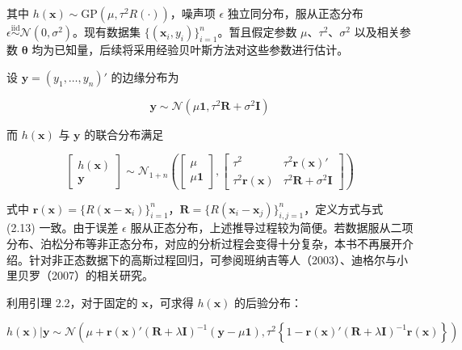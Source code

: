 \documentclass{ctexart}
\begin{document}
其中 $h(\boldsymbol{x})\sim\mathrm{GP}(\mu,\tau^2R(\cdot))$，噪声项 $\epsilon$ 独立同分布，服从正态分布 $\epsilon\stackrel{\text{iid}}{\sim}\mathcal{N}(0,\sigma^2)$。现有数据集 $\{(\boldsymbol{x}_i,y_i)\}_{i=1}^n$。暂且假定参数 $\mu$、$\tau^2$、$\sigma^2$ 以及相关参数 $\boldsymbol{\theta}$ 均为已知量，后续将采用经验贝叶斯方法对这些参数进行估计。

设 $\boldsymbol{y}=(y_1,\dots,y_n)'$ 的边缘分布为

\begin{equation*}
\boldsymbol{y}\sim\mathcal{N}(\mu\boldsymbol{1},\tau^2\boldsymbol{R}+\sigma^2\boldsymbol{I})
\end{equation*}

而 $h(\boldsymbol{x})$ 与 $\boldsymbol{y}$ 的联合分布满足

\begin{equation*}
\begin{bmatrix}
h(\boldsymbol{x})\\\boldsymbol{y}
\end{bmatrix}
\sim\mathcal{N}_{1+n}
\left(\begin{bmatrix}
\mu\\\mu\boldsymbol{1}
\end{bmatrix},\begin{bmatrix}
\tau^2&\tau^2\boldsymbol{r}(\boldsymbol{x})'\\
\tau^2\boldsymbol{r}(\boldsymbol{x})&\tau^2\boldsymbol{R}+\sigma^2\boldsymbol{I}
\end{bmatrix}\right)
\end{equation*}

式中 $\boldsymbol{r}(\boldsymbol{x})=\{R(\boldsymbol{x}-\boldsymbol{x}_i)\}_{i=1}^n$，$\boldsymbol{R}=\{R(\boldsymbol{x}_i-\boldsymbol{x}_j)\}_{i,j=1}^n$，定义方式与式 (2.13) 一致。由于误差 $\epsilon$ 服从正态分布，上述推导过程较为简便。若数据服从二项分布、泊松分布等非正态分布，对应的分析过程会变得十分复杂，本书不再展开介绍。针对非正态数据下的高斯过程回归，可参阅班纳吉等人（2003）、迪格尔与小里贝罗（2007）的相关研究。

利用引理 2.2，对于固定的 $\boldsymbol{x}$，可求得 $h(\boldsymbol{x})$ 的后验分布：

\begin{equation*}
h(\boldsymbol{x})|\boldsymbol{y}\sim\mathcal{N}\left(\mu+\boldsymbol{r}(\boldsymbol{x})'(\boldsymbol{R}+\lambda\boldsymbol{I})^{-1}(\boldsymbol{y}-\mu\boldsymbol{1}),\tau^2\left\{1-\boldsymbol{r}(\boldsymbol{x})'(\boldsymbol{R}+\lambda\boldsymbol{I})^{-1}\boldsymbol{r}(\boldsymbol{x})\right\}\right)
\tag{2.43}
\end{equation*}
\end{document}
